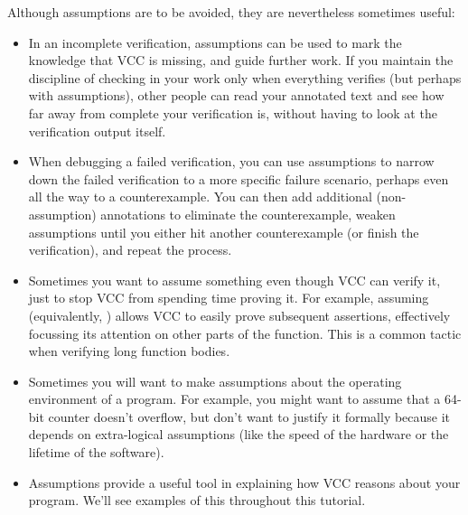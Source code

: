 Although assumptions are to be avoided, they are nevertheless
sometimes useful:
\begin{itemize}
\item In an incomplete verification, assumptions can be used
  to mark the knowledge that VCC is missing, and guide further work.
  If you maintain the discipline of checking in your work only when
  everything verifies (but perhaps with assumptions), other people can
  read your annotated text and see how far away from complete your
  verification is, without having to look at the verification output
  itself.
\item When debugging a failed verification, you can use assumptions to
  narrow down the failed verification to a more specific failure
  scenario, perhaps even all the way to a counterexample. You can then
  add additional (non-assumption) annotations to eliminate the
  counterexample, weaken assumptions until you either hit another
  counterexample (or finish the verification), and repeat the process.
\item Sometimes you want to assume something even though VCC can
  verify it, just to stop VCC from spending time proving it. For
  example, assuming \vcc{\false} (equivalently, ) allows VCC to 
  easily prove subsequent assertions, effectively focussing its
  attention on other parts of the function. This is a common tactic
  when verifying long function bodies.
\item Sometimes you will want to make assumptions about the operating
  environment of a program. For example, you might want to assume that
  a 64-bit counter doesn't overflow, but don't want to justify it
  formally because it depends on extra-logical assumptions (like the
  speed of the hardware or the lifetime of the software). 
\item Assumptions provide a useful tool in explaining how VCC
  reasons about your program. We'll see examples of this throughout
  this tutorial.
\end{itemize}




